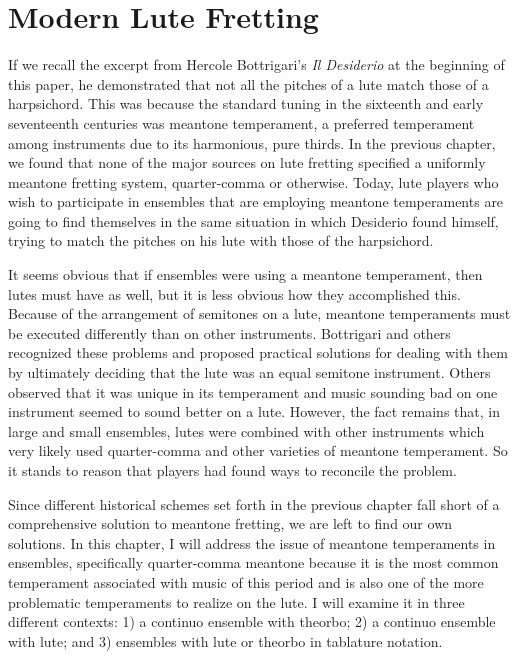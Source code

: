 \chapter{Modern Lute Fretting}

If we recall the excerpt from Hercole Bottrigari's \textit{Il Desiderio} at the beginning of this paper, he demonstrated
that not all the pitches of a lute match those of a harpsichord. This was because the standard tuning in the sixteenth
and early seventeenth centuries was meantone temperament, a preferred temperament among instruments due to its
harmonious, pure thirds. In the previous chapter, we found that none of the major sources on lute fretting specified a
uniformly meantone fretting system, quarter-comma or otherwise. Today, lute players who wish to participate in ensembles
that are employing meantone temperaments are going to find themselves in the same situation in which Desiderio found
himself, trying to match the pitches on his lute with those of the harpsichord.

It seems obvious that if ensembles were using a meantone temperament, then lutes must have as well, but it is less
obvious how they accomplished this. Because of the arrangement of semitones on a lute, meantone temperaments must be
executed differently than on other instruments. Bottrigari and others recognized these problems and proposed practical
solutions for dealing with them by ultimately deciding that the lute was an equal semitone instrument. Others observed
that it was unique in its temperament and music sounding bad on one instrument seemed to sound better on a
lute.\autocite[45]{ML:1} However, the fact remains that, in large and small ensembles, lutes were combined with other
instruments which very likely used quarter-comma and other varieties of meantone temperament. So it stands to reason
that players had found ways to reconcile the problem.

Since different historical schemes set forth in the previous chapter fall short of a comprehensive solution to meantone
fretting, we are left to find our own solutions. In this chapter, I will address the issue of meantone temperaments in
ensembles, specifically quarter-comma meantone because it is the most common temperament associated with music of this
period and is also one of the more problematic temperaments to realize on the lute. I will examine it in three different
contexts: 1) a continuo ensemble with theorbo; 2) a continuo ensemble with lute; and 3) ensembles with lute or theorbo
in tablature notation.

